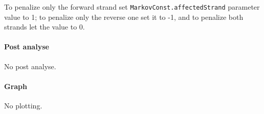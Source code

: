 To penalize only the forward strand set 
\texttt{MarkovConst.affectedStrand} parameter value to 1;
to penalize only the reverse one set it to -1, and to penalize both strands let the value to 0.

\paragraph{Post analyse}

No post analyse.

\paragraph{Graph}

No plotting.

